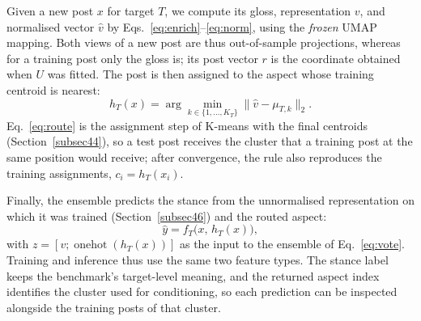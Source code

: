 \documentclass[pdflatex,sn-mathphys-num,iicol]{sn-jnl}%
\begin{document}
Given a new post \(x\) for target \(T\), we compute its gloss, representation \(v\), and normalised vector \(\hat{v}\) by Eqs.~\eqref{eq:enrich}--\eqref{eq:norm}, using the \emph{frozen} UMAP mapping. Both views of a new post are thus out-of-sample projections, whereas for a training post only the gloss is; its post vector \(r\) is the coordinate obtained when \(U\) was fitted. The post is then assigned to the aspect whose training centroid is nearest:
\begin{equation}\label{eq:route}
h_T(x) = \arg\min_{k \in \{1,\dots,K_T\}} \bigl\lVert \hat{v} - \mu_{T,k} \bigr\rVert_2 .
\end{equation}
Eq.~\eqref{eq:route} is the assignment step of K-means with the final centroids (Section~\ref{subsec44}), so a test post receives the cluster that a training post at the same position would receive; after convergence, the rule also reproduces the training assignments, \(c_i = h_T(x_i)\).

Finally, the ensemble predicts the stance from the unnormalised representation on which it was trained (Section~\ref{subsec46}) and the routed aspect:
\begin{equation}\label{eq:predict}
\hat{y} = f_T\bigl(x,\, h_T(x)\bigr),
\end{equation}
with \(z = [v; \operatorname{onehot}(h_T(x))]\) as the input to the ensemble of Eq.~\eqref{eq:vote}.
Training and inference thus use the same two feature types. The stance label keeps the benchmark's target-level meaning, and the returned aspect index identifies the cluster used for conditioning, so each prediction can be inspected alongside the training posts of that cluster.
\end{document}
